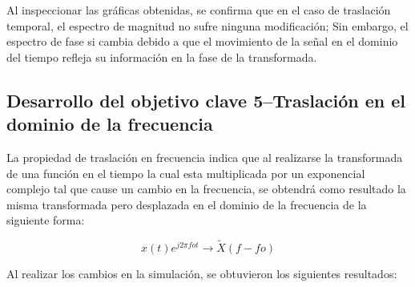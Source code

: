 \documentclass[11pt,letterpaper,twocolumn]{article}
\begin{document}
        Al inspeccionar las gráficas obtenidas, se confirma que en el caso de traslación temporal, el espectro de magnitud no sufre ninguna modificación; Sin embargo, el espectro de fase si cambia debido a que el movimiento de la señal en el dominio del tiempo refleja su información en la fase de la transformada.
        
    \subsection{Desarrollo del objetivo clave 5--Traslación en el dominio de la frecuencia}
        La propiedad de traslación en frecuencia indica que al realizarse la transformada de una función en el tiempo la cual esta multiplicada por un exponencial complejo tal que cause un cambio en la frecuencia, se obtendrá como resultado la misma transformada pero desplazada en el dominio de la frecuencia de la siguiente forma: 
        
        \begin{equation}
            {x}(t)e^{j2 \pi fot} \rightarrow \tilde{X}(f-fo)
            \label{TFrecuencia}
        \end{equation}
        
        Al realizar los cambios en la simulación, se obtuvieron los siguientes resultados:
        
\end{document}
